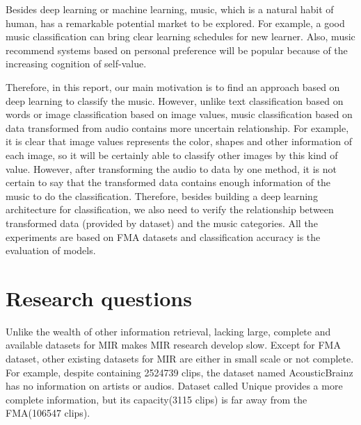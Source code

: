 \documentclass{article}
\begin{document}
Besides deep learning or machine learning, music, which is a natural habit of human, has a remarkable potential market to be explored. For example, a good music classification can bring clear learning schedules for new learner. Also, music recommend systems based on personal preference will be popular because of the increasing cognition of self-value. 

Therefore, in this report, our main motivation is to find an approach based on deep learning to classify the music. However, unlike text classification based on words or image classification based on image values, music classification based on data transformed from audio contains more uncertain relationship. For example, it is clear that image values represents the color, shapes and other information of each image, so it will be certainly able to classify other images by this kind of value. However, after transforming the audio to data by one method, it is not certain to say that the transformed data contains enough information of the music to do the classification. Therefore, besides building a deep learning architecture for classification, we also need to verify the relationship between transformed data (provided by dataset) and the music categories. All the experiments are based on FMA datasets and classification accuracy is the evaluation of models.\citep{fma}


\section{Research questions} 
Unlike the wealth of other information retrieval, lacking large, complete and available datasets for MIR makes MIR research develop slow. Except for FMA dataset, other existing datasets for MIR are either in small scale or not complete. 
For example, despite containing 2524739 clips, the dataset named AcousticBrainz has no information on artists or audios. Dataset called Unique provides a more complete information, but its capacity(3115 clips) is far away from the FMA(106547 clips). \cite{fma}
\end{document}
